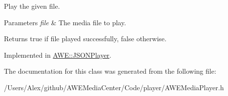 Play the given file. 


\begin{DoxyParams}{Parameters}
{\em file} & The media file to play.\\
\hline
\end{DoxyParams}
\begin{DoxyReturn}{Returns}
{\ttfamily true} if {\ttfamily file} played successfully, {\ttfamily false} otherwise. 
\end{DoxyReturn}


Implemented in \hyperlink{class_a_w_e_1_1_j_s_o_n_player_a417957c7b0826ecef28b232a2cf9d49e}{A\-W\-E\-::\-J\-S\-O\-N\-Player}.



The documentation for this class was generated from the following file\-:\begin{DoxyCompactItemize}
\item 
/\-Users/\-Alex/github/\-A\-W\-E\-Media\-Center/\-Code/player/A\-W\-E\-Media\-Player.\-h\end{DoxyCompactItemize}
